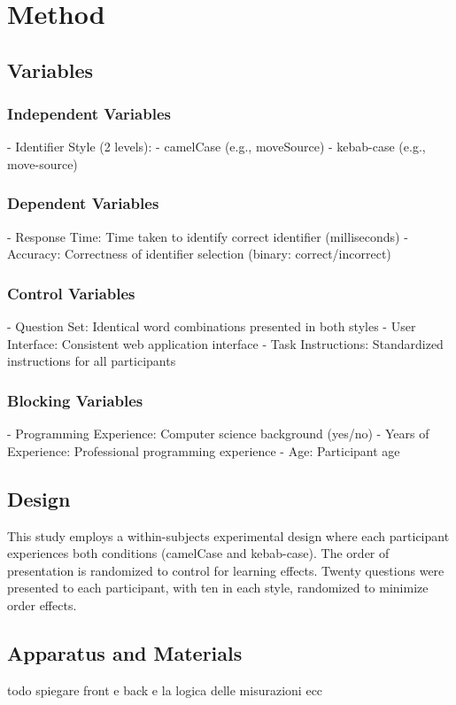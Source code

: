 \documentclass[unicode,11pt,a4paper,oneside,numbers=endperiod,openany]{scrartcl}
\begin{document}
\section{Method}
\subsection{Variables}

\subsubsection{Independent Variables}
- Identifier Style (2 levels):
  - camelCase (e.g., moveSource)
  - kebab-case (e.g., move-source)

\subsubsection{Dependent Variables}
- Response Time: Time taken to identify correct identifier (milliseconds)
- Accuracy: Correctness of identifier selection (binary: correct/incorrect)

\subsubsection{Control Variables}
- Question Set: Identical word combinations presented in both styles
- User Interface: Consistent web application interface
- Task Instructions: Standardized instructions for all participants

\subsubsection{Blocking Variables}
- Programming Experience: Computer science background (yes/no)
- Years of Experience: Professional programming experience
- Age: Participant age

\subsection{Design}
This study employs a within-subjects experimental design where each participant experiences both conditions (camelCase and kebab-case). The order of presentation is randomized to control for learning effects. Twenty questions were presented to each participant, with ten in each style, randomized to minimize order effects.

\subsection{Apparatus and Materials}
todo spiegare front e back e la logica delle misurazioni ecc
\end{document}
